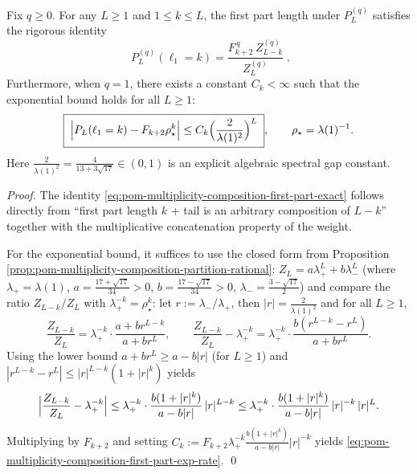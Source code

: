 \begin{proposition}\label{prop:pom-multiplicity-composition-first-part-exact-and-rate}
Fix \(q\ge 0\). For any \(L\ge 1\) and \(1\le k\le L\), the first part length under \(P_L^{(q)}\) satisfies the rigorous identity
\begin{equation}\label{eq:pom-multiplicity-composition-first-part-exact}
\boxed{\;
P_L^{(q)}(\ell_1=k)=\frac{F_{k+2}^{\,q}\,Z_{L-k}^{(q)}}{Z_L^{(q)}}\; }.
\end{equation}
Furthermore, when \(q=1\), there exists a constant \(C_k<\infty\) such that the exponential bound holds for all \(L\ge 1\):
\begin{equation}\label{eq:pom-multiplicity-composition-first-part-exp-rate}
\boxed{\;
\Bigl|P_L(\ell_1=k)-F_{k+2}\rho_\star^{k}\Bigr|
\le C_k\Bigl(\frac{2}{\lambda(1)^2}\Bigr)^{L}\; } ,
\qquad
\rho_\star=\lambda(1)^{-1}.
\end{equation}
Here \(\frac{2}{\lambda(1)^2}=\frac{4}{13+3\sqrt{17}}\in(0,1)\) is an explicit algebraic spectral gap constant.
\end{proposition}
\begin{proof}
The identity \eqref{eq:pom-multiplicity-composition-first-part-exact} follows directly from ``first part length \(k\) + tail is an arbitrary composition of \(L-k\)'' together with the multiplicative concatenation property of the weight.
\par
For the exponential bound, it suffices to use the closed form from Proposition \ref{prop:pom-multiplicity-composition-partition-rational}:
\(
Z_L=a\lambda_+^L+b\lambda_-^L
\)
(where \(\lambda_+=\lambda(1)\), \(a=\frac{17+\sqrt{17}}{34}>0\), \(b=\frac{17-\sqrt{17}}{34}>0\), \(\lambda_-=\frac{3-\sqrt{17}}{2}\))
and compare the ratio \(Z_{L-k}/Z_L\) with \(\lambda_+^{-k}=\rho_\star^{k}\):
let \(r:=\lambda_-/\lambda_+\), then \(|r|=\frac{2}{\lambda(1)^2}\) and for all \(L\ge 1\),
\[
\frac{Z_{L-k}}{Z_L}
=\lambda_+^{-k}\cdot\frac{a+br^{L-k}}{a+br^L},
\qquad
\frac{Z_{L-k}}{Z_L}-\lambda_+^{-k}
=\lambda_+^{-k}\cdot\frac{b(r^{L-k}-r^L)}{a+br^L}.
\]
Using the lower bound \(a+br^L\ge a-b|r|\) (for \(L\ge 1\)) and \(|r^{L-k}-r^L|\le |r|^{L-k}(1+|r|^k)\) yields
\[
\Bigl|\frac{Z_{L-k}}{Z_L}-\lambda_+^{-k}\Bigr|
\le
\lambda_+^{-k}\cdot \frac{b(1+|r|^k)}{a-b|r|}\,|r|^{L-k}
\le
\lambda_+^{-k}\cdot \frac{b(1+|r|^k)}{a-b|r|}\,|r|^{-k}\,|r|^L.
\]
Multiplying by \(F_{k+2}\) and setting
\(
C_k:=F_{k+2}\lambda_+^{-k}\frac{b(1+|r|^k)}{a-b|r|}|r|^{-k}
\)
yields \eqref{eq:pom-multiplicity-composition-first-part-exp-rate}. \qed
\end{proof}

